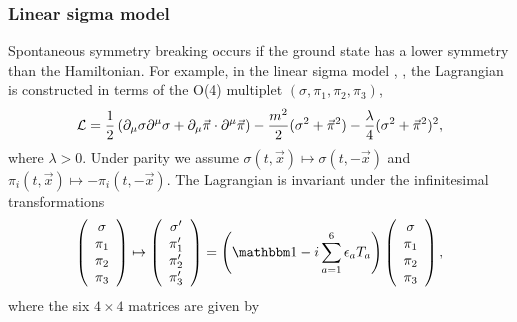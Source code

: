 \documentclass[twoside,12pt]{article}
\begin{document}
\subsubsection{Linear sigma model}
   Spontaneous symmetry breaking occurs if the ground state has a lower symmetry
than the Hamiltonian.
   For example, in the linear sigma model \cite{Schwinger:1957em}, \cite{Gell-Mann:1960np},
the Lagrangian is constructed in terms of the O(4) multiplet $(\sigma,\pi_1,\pi_2,\pi_3)$,
\begin{equation}
\label{2:2:1:lsm}
{\cal L}=\frac{1}{2}\left(\partial_\mu\sigma\partial^\mu\sigma+
\partial_\mu\vec\pi\cdot\partial^\mu\vec\pi\right)
-\frac{m^2}{2}(\sigma^2+\vec\pi^2)-\frac{\lambda}{4}(\sigma^2+\vec\pi^2)^2,
\end{equation}
where $\lambda>0$.
   Under parity we assume $\sigma(t,\vec x)\mapsto \sigma(t,-\vec x)$ and
$\pi_i(t,\vec x)\mapsto -\pi_i(t,-\vec x)$.
   The Lagrangian is invariant under the infinitesimal transformations
\begin{displaymath}
\left(\begin{array}{c} \sigma\\ \pi_1 \\ \pi_2\\ \pi_3\end{array}\right)
\mapsto
\left(\begin{array}{c} \sigma'\\ \pi'_1\\ \pi'_2\\ \pi'_3\end{array}\right)
=\left({\mathbbm 1}-i\sum_{a=1}^6\epsilon_a T_a\right)
\left(\begin{array}{c} \sigma\\ \pi_1 \\ \pi_2\\ \pi_3\end{array}\right),
\end{displaymath}
where the six
$4\times 4$ matrices are given by
\end{document}
